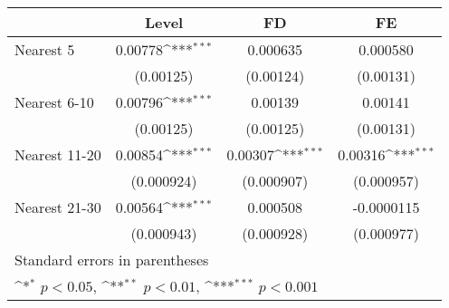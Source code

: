 {
\def\sym#1{\ifmmode^{#1}\else\(^{#1}\)\fi}
\begin{tabular}{l*{3}{c}}
\hline\hline
            &\multicolumn{1}{c}{Level}&\multicolumn{1}{c}{FD}&\multicolumn{1}{c}{FE}\\
\hline
Nearest 5   &     0.00778\sym{***}&    0.000635         &    0.000580         \\
            &   (0.00125)         &   (0.00124)         &   (0.00131)         \\
[1em]
Nearest 6-10&     0.00796\sym{***}&     0.00139         &     0.00141         \\
            &   (0.00125)         &   (0.00125)         &   (0.00131)         \\
[1em]
Nearest 11-20&     0.00854\sym{***}&     0.00307\sym{***}&     0.00316\sym{***}\\
            &  (0.000924)         &  (0.000907)         &  (0.000957)         \\
[1em]
Nearest 21-30&     0.00564\sym{***}&    0.000508         &  -0.0000115         \\
            &  (0.000943)         &  (0.000928)         &  (0.000977)         \\
\hline\hline
\multicolumn{4}{l}{\footnotesize Standard errors in parentheses}\\
\multicolumn{4}{l}{\footnotesize \sym{*} \(p<0.05\), \sym{**} \(p<0.01\), \sym{***} \(p<0.001\)}\\
\end{tabular}
}
